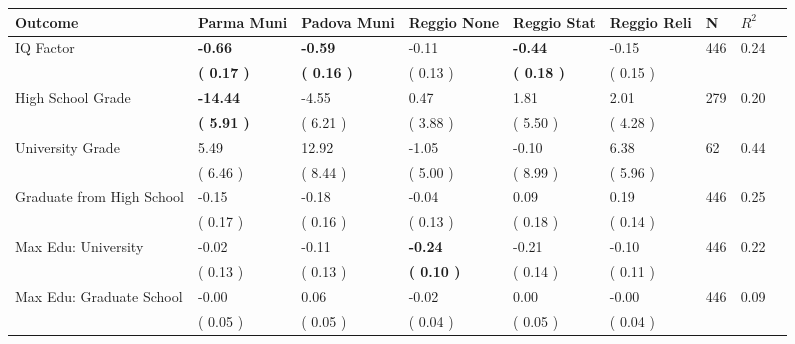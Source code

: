 \begin{tabular}{L{6.2cm} C{1.8cm} C{1.8cm} C{1.8cm} C{1.8cm} C{1.8cm} C{1.8cm} C{0.3cm} C{0.3cm}}
\toprule
 \textbf{Outcome} & \textbf{Parma Muni} & \textbf{Padova Muni} & \textbf{Reggio None} & \textbf{Reggio Stat} & \textbf{Reggio Reli} & \textbf{N} & \textbf{$ R^2$} \\
\midrule
IQ Factor & \textbf{    -0.66} & \textbf{    -0.59} &     -0.11 & \textbf{    -0.44} &     -0.15  & 446 &       0.24 \\ 
 & \textbf{(     0.17 )} & \textbf{(     0.16 )} & (     0.13 ) & \textbf{(     0.18 )} & (     0.15 )  & \\
High School Grade & \textbf{   -14.44} &     -4.55 &      0.47 &      1.81 &      2.01  & 279 &       0.20 \\ 
 & \textbf{(     5.91 )} & (     6.21 ) & (     3.88 ) & (     5.50 ) & (     4.28 )  & \\
University Grade &      5.49 &     12.92 &     -1.05 &     -0.10 &      6.38  & 62 &       0.44 \\ 
 & (     6.46 ) & (     8.44 ) & (     5.00 ) & (     8.99 ) & (     5.96 )  & \\
Graduate from High School &     -0.15 &     -0.18 &     -0.04 &      0.09 &      0.19  & 446 &       0.25 \\ 
 & (     0.17 ) & (     0.16 ) & (     0.13 ) & (     0.18 ) & (     0.14 )  & \\
Max Edu: University &     -0.02 &     -0.11 & \textbf{    -0.24} &     -0.21 &     -0.10  & 446 &       0.22 \\ 
 & (     0.13 ) & (     0.13 ) & \textbf{(     0.10 )} & (     0.14 ) & (     0.11 )  & \\
Max Edu: Graduate School &     -0.00 &      0.06 &     -0.02 &      0.00 &     -0.00  & 446 &       0.09 \\ 
 & (     0.05 ) & (     0.05 ) & (     0.04 ) & (     0.05 ) & (     0.04 )  & \\
\bottomrule
\end{tabular}
